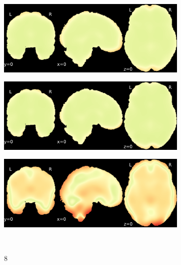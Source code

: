 \documentclass{article}
\begin{document}
\begin{appendices}
\begin{landscape}
\begin{figure}
\begin{subfigure}[t]{0.2\paperheight}
            \end{subfigure}
            \begin{subfigure}[t]{0.2\paperheight}
                \centering
                \includegraphics[width=\textwidth]{figures/sig/20mm/rr_ds002338_sub-xp201_sig.pdf}
            \end{subfigure}
            \begin{subfigure}[t]{0.2\paperheight}
                \centering
                \includegraphics[width=\textwidth]{figures/sig/20mm/rs_ds002338_sub-xp201_sig.pdf}
            \end{subfigure}
            \begin{subfigure}[t]{0.2\paperheight}
                \centering
                \includegraphics[width=\textwidth]{figures/sig/20mm/rr.rs_ds002338_sub-xp201_sig.pdf}
            \end{subfigure} \\
            \begin{subfigure}[b][][c]{0.01\paperwidth} 8 \vspace*{15pt} \end{subfigure}

\end{figure}
\end{landscape}
\end{appendices}
\end{document}
